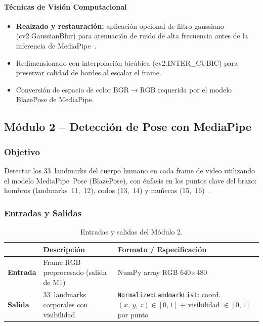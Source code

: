 \paragraph{Técnicas de Visión Computacional}
\begin{itemize}[leftmargin=1.5em]
  \item \textbf{Realzado y restauración:} aplicación opcional de filtro
        gaussiano (cv2.GaussianBlur) para atenuación de ruido
        de alta frecuencia antes de la inferencia de
        MediaPipe~\cite{GonzalezWoods2018}.
  \item Redimensionado con interpolación bicúbica
        (cv2.INTER\_CUBIC) para preservar calidad de bordes
        al escalar el frame.
  \item Conversión de espacio de color BGR$\to$RGB requerida por el
        modelo BlazePose de MediaPipe.
\end{itemize}

\subsection{Módulo 2 -- Detección de Pose con MediaPipe}
\subsubsection*{Objetivo}

Detectar los 33~landmarks del cuerpo humano en cada frame de video
utilizando el modelo MediaPipe~Pose (BlazePose), con énfasis en los
puntos clave del brazo: hombros (landmarks~11,~12), codos
(13,~14) y muñecas (15,~16)~\cite{Bazarevskyetal2020}.

\subsubsection*{Entradas y Salidas}

\begin{table}[h!]
\centering
\label{tab:m1_io}
\renewcommand{\arraystretch}{1.3}
\begin{tabularx}{\textwidth}{
    >{\bfseries}p{3cm}
    X
    X
}    
\toprule
&
\textbf{Descripción} &
\textbf{Formato / Especificación} \\
\midrule
Entrada &
  Frame RGB preprocesado (salida de M1) &
  NumPy array RGB 640$\times$480 \\
\midrule
Salida &
  33~landmarks corporales con visibilidad &
  \texttt{NormalizedLandmarkList}: coord.\
  $(x,\,y,\,z) \in [0,1]$ + visibilidad $\in [0,1]$
  por punto \\
\bottomrule
\end{tabularx}
\caption{Entradas y salidas del Módulo 2.}
\end{table}
 
